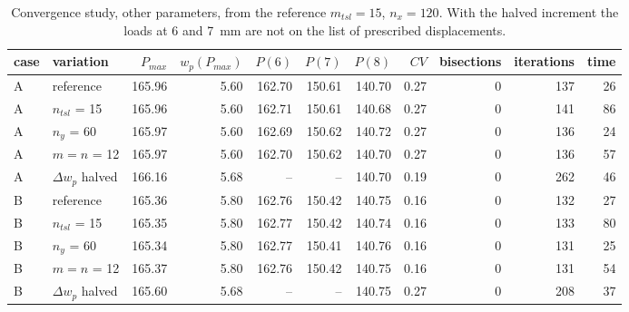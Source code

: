 \begin{table}[htb]
	\centering
	\caption{Convergence study, other parameters, from the reference $m_{tsl} = 15$, $n_x = 120$. With the halved increment the loads at 6 and 7~mm are not on the list of prescribed displacements.}
	\label{tab:cz-dev-conv-other}
	\small
	\begin{tabular}{llrrrrrrrrr}
		\toprule
		case & variation & $P_{max}$ & $w_p(P_{max})$ & $P(6)$ & $P(7)$ & $P(8)$ & $CV$ & bisections & iterations & time \\
		\midrule
		A & reference & 165.96 & 5.60 & 162.70 & 150.61 & 140.70 & 0.27 & 0 & 137 & 26 \\
		A & $n_{tsl}$ = 15 & 165.96 & 5.60 & 162.71 & 150.61 & 140.68 & 0.27 & 0 & 141 & 86 \\
		A & $n_y$ = 60 & 165.97 & 5.60 & 162.69 & 150.62 & 140.72 & 0.27 & 0 & 136 & 24 \\
		A & $m = n$ = 12 & 165.97 & 5.60 & 162.70 & 150.62 & 140.70 & 0.27 & 0 & 136 & 57 \\
		A & $\Delta w_p$ halved & 166.16 & 5.68 & -- & -- & 140.70 & 0.19 & 0 & 262 & 46 \\
		B & reference & 165.36 & 5.80 & 162.76 & 150.42 & 140.75 & 0.16 & 0 & 132 & 27 \\
		B & $n_{tsl}$ = 15 & 165.35 & 5.80 & 162.77 & 150.42 & 140.74 & 0.16 & 0 & 133 & 80 \\
		B & $n_y$ = 60 & 165.34 & 5.80 & 162.77 & 150.41 & 140.76 & 0.16 & 0 & 131 & 25 \\
		B & $m = n$ = 12 & 165.37 & 5.80 & 162.76 & 150.42 & 140.75 & 0.16 & 0 & 131 & 54 \\
		B & $\Delta w_p$ halved & 165.60 & 5.68 & -- & -- & 140.75 & 0.27 & 0 & 208 & 37 \\
		\bottomrule
	\end{tabular}
\end{table}

